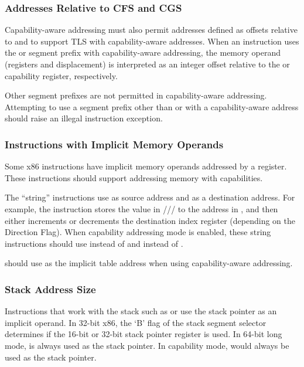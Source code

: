 \subsubsection{Addresses Relative to CFS and CGS}
\label{sec:x86:cfs-cgs}

Capability-aware addressing must also permit addresses defined as
offsets relative to \CFS{} and \CGS{} to support TLS with
capability-aware addresses.  When an instruction uses the \FS{} or
\GS{} segment prefix with capability-aware addressing, the memory
operand (registers and displacement) is interpreted as an integer
offset relative to the \CFS{} or \CGS{} capability register,
respectively.

Other segment prefixes are not permitted in capability-aware
addressing.  Attempting to use a segment prefix other than \FS{} or
\GS{} with a capability-aware address should raise an illegal
instruction exception.

\subsubsection{Instructions with Implicit Memory Operands}

Some x86 instructions have implicit memory operands addressed by a
register.  These instructions should support addressing memory with
capabilities.

The ``string''
instructions use \RSI{} as source address and \RDI{} as a destination address.
For example, the
 instruction stores the value in \AL{}/\AX{}/\EAX{}/\RAX{} to the address in
\RDI{}, and then either increments or decrements the destination
index register (depending on the Direction Flag).  When capability
addressing mode is enabled,
these string instructions should use \CSI{} instead of \RSI{} and \CDI{} instead of
\RDI{}.

 should use \CBX{} as the implicit table address when
using capability-aware addressing.

\subsubsection{Stack Address Size}

Instructions that work with the stack such as  or
 use the stack pointer as an implicit operand.  In
32-bit x86, the `B' flag of the stack segment selector determines if
the 16-bit or 32-bit stack pointer register is used.  In 64-bit long
mode, \RSP{} is always used as the stack pointer.  In capability mode,
\CSP{} would always be used as the stack pointer.

